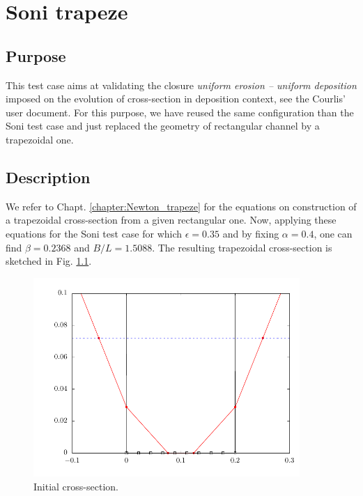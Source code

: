 \chapter{Soni trapeze}\label{chapter:Soni_trapeze}

\section{Purpose}

This test case aims at validating the closure {\em uniform erosion -- uniform deposition}
imposed on the evolution of cross-section in deposition context, see the Courlis' user document.
For this purpose, we have reused the same configuration than the Soni test case
and just replaced the geometry of rectangular channel by a trapezoidal one.

\section{Description}

We refer to Chapt. \ref{chapter:Newton_trapeze} for the equations on construction of
a trapezoidal cross-section from a given rectangular one. Now, applying these equations
for the Soni test case for which $\epsilon = 0.35$ and by fixing $\alpha = 0.4$,
one can find $\beta = 0.2368$ and $B/L = 1.5088$. The resulting trapezoidal cross-section
is sketched in Fig. \ref{soni_trapeze:fig:profile_init}.

\begin{figure}[!ht]
 \centering
 \includegraphics[width=0.9\textwidth]{profile_init.pdf}
 \caption{Initial cross-section.}
 \label{soni_trapeze:fig:profile_init}
\end{figure}

